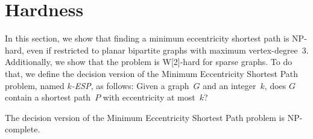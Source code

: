 \section{Hardness}
    \label{sec:mesp_Hardness}

In this section, we show that finding a minimum eccentricity shortest path is NP-hard, even if restricted to planar bipartite graphs with maximum vertex-degree~$3$.
Additionally, we show that the problem is W[2]-hard for sparse graphs.
To do that, we define the decision version of the Minimum Eccentricity Shortest Path problem, named \emph{\( k \)-ESP}, as follows:
Given a graph~$G$ and an integer~$k$, does $G$ contain a shortest path~$P$ with eccentricity at most~$k$?

\begin{theorem}
    \label{theo:kDomShortNPc}
The decision version of the Minimum Eccentricity Shortest Path problem is NP-complete.
\end{theorem}

